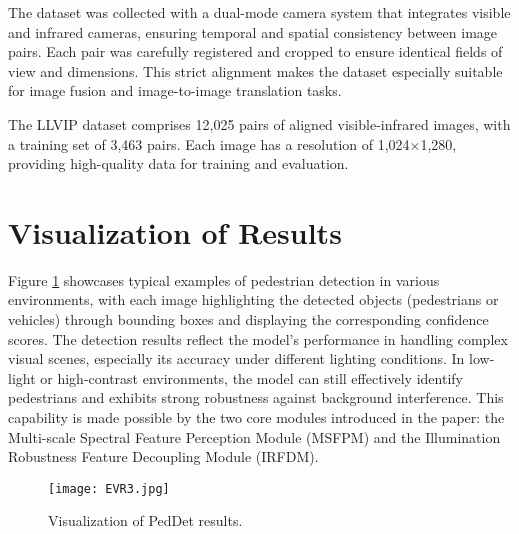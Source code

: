 The dataset was collected with a dual-mode camera system that integrates visible and infrared cameras, ensuring temporal and spatial consistency between image pairs. Each pair was carefully registered and cropped to ensure identical fields of view and dimensions. This strict alignment makes the dataset especially suitable for image fusion and image-to-image translation tasks.

The LLVIP dataset comprises 12,025 pairs of aligned visible-infrared images, with a training set of 3,463 pairs. Each image has a resolution of 1,024$\times$1,280, providing high-quality data for training and evaluation.

\section{Visualization of Results}
Figure \ref{fig:vis2} showcases typical examples of pedestrian detection in various environments, with each image highlighting the detected objects (pedestrians or vehicles) through bounding boxes and displaying the corresponding confidence scores. The detection results reflect the model's performance in handling complex visual scenes, especially its accuracy under different lighting conditions. In low-light or high-contrast environments, the model can still effectively identify pedestrians and exhibits strong robustness against background interference. This capability is made possible by the two core modules introduced in the paper: the Multi-scale Spectral Feature Perception Module (MSFPM) and the Illumination Robustness Feature Decoupling Module (IRFDM).

\begin{figure}[h]
    \centering
    \texttt{[image: EVR3.jpg]}
    \caption{Visualization of PedDet results.}
    \label{fig:vis2}
\end{figure}




